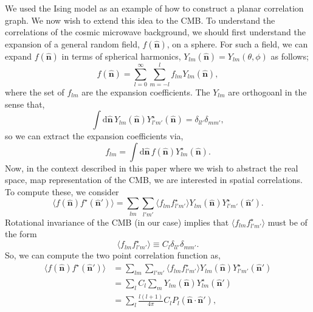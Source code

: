 \documentclass[11pt]{article}
\numberwithin{equation}{section}
\numberwithin{figure}{section}
\numberwithin{table}{section}
\numberwithin{definition}{section}
\begin{document}
We used the Ising model as an example of how to construct a planar correlation graph. We now wish to extend this idea to the CMB. To understand the correlations of the cosmic microwave background, we should first understand the expansion of a general random field, $f(\hat{\mathbf{n}})$, on a sphere. For such a field, we can expand $f(\hat{\mathbf{n}})$ in terms of spherical harmonics, $Y_{lm}(\hat{\mathbf{n}}) = Y_{lm}(\theta, \phi)$ as follows;
\begin{equation}
f(\hat{\mathbf{n}}) = \sum_{l = 0}^{\infty}{\sum_{m = -l}^{l}{f_{lm} Y_{lm}(\hat{\mathbf{n}})}},
\end{equation}
where the set of $f_{lm}$ are the expansion coefficients. The $Y_{lm}$ are orthogoanl in the sense that,
\begin{equation}
\int{\textrm{d}{\hat{\mathbf{n}}}\,Y_{lm}(\hat{\mathbf{n}})Y^{\star}_{l'm'}(\hat{\mathbf{n}})} = \delta_{ll'}\delta_{mm'},
\end{equation}
so we can extract the expansion coefficients via,
\begin{equation}
f_{lm} = \int{\textrm{d}\hat{\mathbf{n}}\,f(\hat{\mathbf{n}})Y^{\star}_{lm}(\hat{\mathbf{n}})}.
\end{equation}
Now, in the context described in this paper where we wish to abstract the real space, map representation of the CMB, we are interested in spatial correlations. To compute these, we consider
\begin{equation}
\langle f(\hat{\mathbf{n}}) f^{\star}(\hat{\mathbf{n}}')\rangle = \sum_{lm}{\sum_{l'm'}{\langle f_{lm} f^\star_{l'm'}\rangle Y_{lm}(\hat{\mathbf{n}}) Y^{\star}_{l'm'}(\hat{\mathbf{n}}')}}.
\end{equation}
Rotational invariance of the CMB (in our case) implies that $\langle f_{lm} f^\star_{l'm'}\rangle$ must be of the form
\begin{equation}
\langle f_{lm} f^\star_{l'm'}\rangle \equiv C_l \delta_{ll'}\delta_{mm'}.
\end{equation}
So, we can compute the two point correlation function as,
\begin{align*}
\langle f(\hat{\mathbf{n}}) f^{\star}(\hat{\mathbf{n}}')\rangle &= \sum_{lm}{\sum_{l'm'}{\langle f_{lm} f^\star_{l'm'}\rangle Y_{lm}(\hat{\mathbf{n}}) Y^{\star}_{l'm'}(\hat{\mathbf{n}}')}} \\
&= \sum_{l}{C_l\sum_{m}{Y_{lm}(\hat{\mathbf{n}})Y^\star_{lm}(\hat{\mathbf{n}}')}} \\
&= \sum_{l}{\frac{l(l + 1)}{4\pi}C_l P_l(\hat{\mathbf{n}}\cdot\hat{\mathbf{n}}')},
\end{align*}
\end{document}
